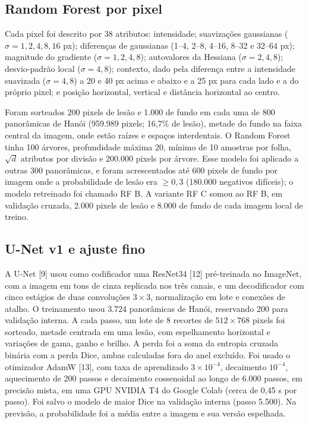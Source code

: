 \documentclass[twocolumn]{article}
\begin{document}
\subsection{Random Forest por pixel}

Cada pixel foi descrito por 38 atributos: intensidade; suavizações gaussianas ($\sigma = 1, 2, 4, 8, 16$ px); diferenças de gaussianas (1--4, 2--8, 4--16, 8--32 e 32--64 px); magnitude do gradiente ($\sigma = 1, 2, 4, 8$); autovalores da Hessiana ($\sigma = 2, 4, 8$); desvio-padrão local ($\sigma = 4, 8$); contexto, dado pela diferença entre a intensidade suavizada ($\sigma = 4, 8$) a 20 e 40 px acima e abaixo e a 25 px para cada lado e a do próprio pixel; e posição horizontal, vertical e distância horizontal ao centro.

Foram sorteados 200 pixels de lesão e 1.000 de fundo em cada uma de 800 panorâmicas de Hanói (959.989 pixels; 16,7\% de lesão), metade do fundo na faixa central da imagem, onde estão raízes e espaços interdentais. O Random Forest tinha 100 árvores, profundidade máxima 20, mínimo de 10 amostras por folha, $\sqrt{d}$ atributos por divisão e 200.000 pixels por árvore. Esse modelo foi aplicado a outras 300 panorâmicas, e foram acrescentados até 600 pixels de fundo por imagem onde a probabilidade de lesão era $\geq 0{,}3$ (180.000 negativos difíceis); o modelo retreinado foi chamado RF B. A variante RF C somou ao RF B, em validação cruzada, 2.000 pixels de lesão e 8.000 de fundo de cada imagem local de treino.

\subsection{U-Net v1 e ajuste fino}

A U-Net [9] usou como codificador uma ResNet34 [12] pré-treinada no ImageNet, com a imagem em tons de cinza replicada nos três canais, e um decodificador com cinco estágios de duas convoluções $3 \times 3$, normalização em lote e conexões de atalho. O treinamento usou 3.724 panorâmicas de Hanói, reservando 200 para validação interna. A cada passo, um lote de 8 recortes de $512 \times 768$ pixels foi sorteado, metade centrada em uma lesão, com espelhamento horizontal e variações de gama, ganho e brilho. A perda foi a soma da entropia cruzada binária com a perda Dice, ambas calculadas fora do anel excluído. Foi usado o otimizador AdamW [13], com taxa de aprendizado $3 \times 10^{-4}$, decaimento $10^{-4}$, aquecimento de 200 passos e decaimento cossenoidal ao longo de 6.000 passos, em precisão mista, em uma GPU NVIDIA T4 do Google Colab (cerca de 0,45 s por passo). Foi salvo o modelo de maior Dice na validação interna (passo 5.500). Na previsão, a probabilidade foi a média entre a imagem e sua versão espelhada.
\end{document}
